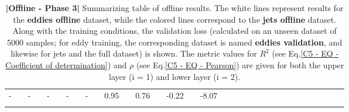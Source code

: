 \begin{table}[H]
\begin{tabular}{llclclclclclclclclclclclclclclcl}
-     		&  & -                  &  & -            &   &  -                                         &  &  -           &  & 0.95      &  & 0.76      &  & -0.22    &  & -8.07             \\ [0.4em]
\Xhline{1.5pt}\\[-0.8em]      
\end{tabular}
\caption{\textbf{|}\textcolor{section_color}{\textbf{Offline - Phase 3}}\textbf{|} Summarizing table of offline results. The white lines represent results for the \textbf{eddies offline} dataset, while the colored lines correspond to the \textbf{jets offline} dataset. Along with the training conditions, the validation loss (calculated on an unseen dataset of 5000 samples; for eddy training, the corresponding dataset is named \textbf{eddies validation}, and likewise for jets and the full dataset) is shown. The metric values for $R^2$ (see Eq.\ref{C5 - EQ - Coefficient of determination}) and $\rho$ (see Eq.\ref{C5 - EQ - Pearson}) are given for both the upper layer (i = 1) and lower layer (i = 2).}
\label{C5 - TAB - PHASE 3}
\end{table}
\bgroup
